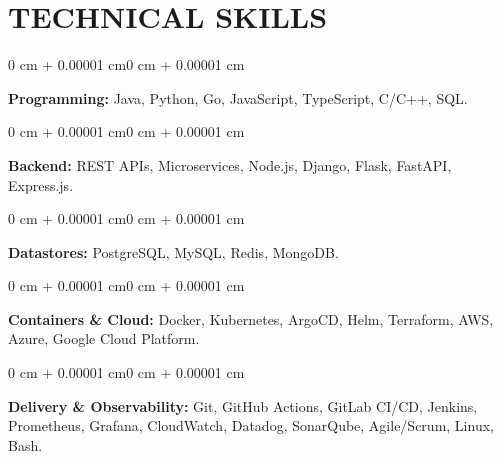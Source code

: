 \documentclass[10pt, letterpaper]{article}
\newenvironment{onecolentry}{
    \begin{adjustwidth}{0 cm + 0.00001 cm}{0 cm + 0.00001 cm}
}{
    \end{adjustwidth}
}
\begin{document}
\section{TECHNICAL SKILLS}
\begin{onecolentry}
\textbf{Programming:} Java, Python, Go, JavaScript, TypeScript, C/C++, SQL.
\end{onecolentry}
\vspace{0.06 cm}
\begin{onecolentry}
\textbf{Backend:} REST APIs, Microservices, Node.js, Django, Flask, FastAPI, Express.js.
\end{onecolentry}
\vspace{0.06 cm}
\begin{onecolentry}
\textbf{Datastores:} PostgreSQL, MySQL, Redis, MongoDB.
\end{onecolentry}
\vspace{0.06 cm}
\begin{onecolentry}
\textbf{Containers \& Cloud:} Docker, Kubernetes, ArgoCD, Helm, Terraform, AWS, Azure, Google Cloud Platform.
\end{onecolentry}
\vspace{0.06 cm}
\begin{onecolentry}
\textbf{Delivery \& Observability:} Git, GitHub Actions, GitLab CI/CD, Jenkins, Prometheus, Grafana, CloudWatch, Datadog, SonarQube, Agile/Scrum, Linux, Bash.
\end{onecolentry}

\end{document}

